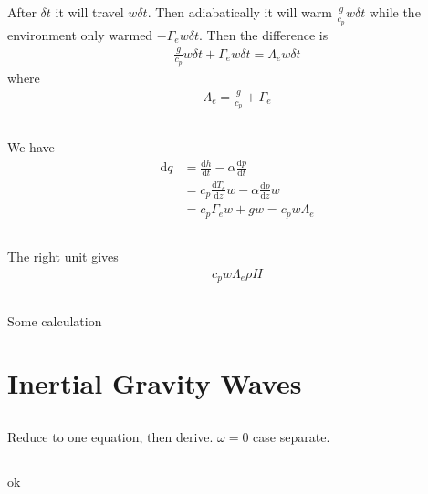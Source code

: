 \documentclass[11pt,letterpaper]{book}
\theoremstyle{definition}
\newcommand{\de}{\mathrm{d}}
\newcommand{\dsp}{\displaystyle}
\begin{document}
\subsection{}
After $\delta t$ it will travel $w\delta t$. Then adiabatically it will warm $\dsp{\frac{g}{c_p}w\delta t}$ while the environment only warmed $-\Gamma_e w\delta t$. Then the difference is
\begin{align*}
    \frac{g}{c_p}w\delta t+\Gamma_e w\delta t = \Lambda_e w\delta t
\end{align*}
where
\begin{align*}
    \Lambda_e = \frac{g}{c_p}+\Gamma_e
\end{align*}

\subsection{}
We have
\begin{align*}
    \de q &= \frac{\de h}{\de t}-\alpha\frac{\de p}{\de t}\\
    &= c_p \frac{\de T_e}{\de z}w-\alpha\frac{\de p}{\de z}w\\
    &= c_p \Gamma_e w+ g w = c_p w\Lambda_e
\end{align*}

\subsection{}
The right unit gives
\begin{align*}
    c_pw\Lambda_e\rho H
\end{align*}

\subsection{}
Some calculation

\section{Inertial Gravity Waves}
\subsection{}
Reduce to one equation, then derive. $\omega = 0$ case separate.

\subsection{}
ok
\end{document}
